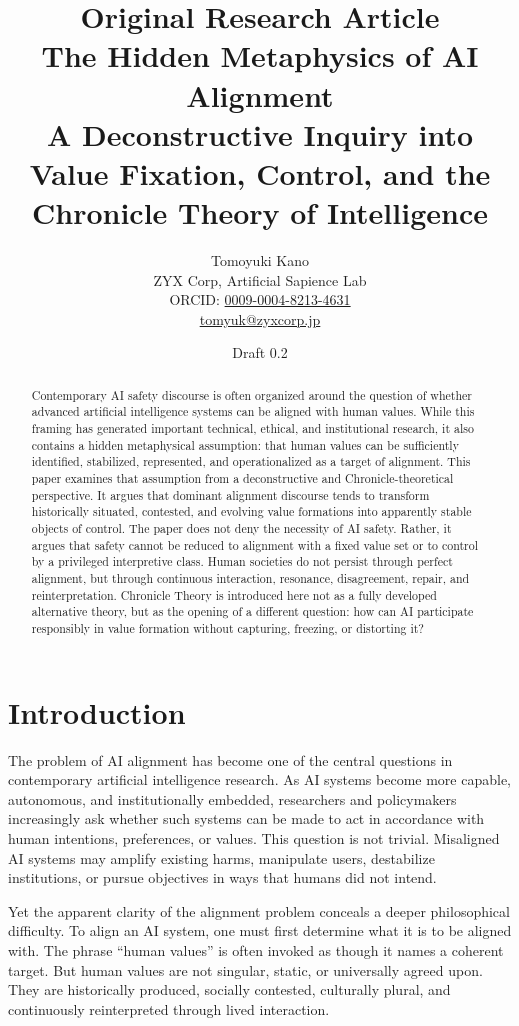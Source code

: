 \documentclass[11pt,a4paper]{article}
\title{\textbf{Original Research Article}\\[0.75em]The Hidden Metaphysics of AI Alignment\\\large A Deconstructive Inquiry into Value Fixation, Control, and the Chronicle Theory of Intelligence}
\author{Tomoyuki Kano\\ZYX Corp, Artificial Sapience Lab\\ORCID: \href{https://orcid.org/0009-0004-8213-4631}{0009-0004-8213-4631}\\\href{mailto:tomyuk@zyxcorp.jp}{tomyuk@zyxcorp.jp}}
\date{Draft 0.2}
\begin{document}
\maketitle

\begin{abstract}
Contemporary AI safety discourse is often organized around the question of whether advanced artificial intelligence systems can be aligned with human values. While this framing has generated important technical, ethical, and institutional research, it also contains a hidden metaphysical assumption: that human values can be sufficiently identified, stabilized, represented, and operationalized as a target of alignment. This paper examines that assumption from a deconstructive and Chronicle-theoretical perspective. It argues that dominant alignment discourse tends to transform historically situated, contested, and evolving value formations into apparently stable objects of control. The paper does not deny the necessity of AI safety. Rather, it argues that safety cannot be reduced to alignment with a fixed value set or to control by a privileged interpretive class. Human societies do not persist through perfect alignment, but through continuous interaction, resonance, disagreement, repair, and reinterpretation. Chronicle Theory is introduced here not as a fully developed alternative theory, but as the opening of a different question: how can AI participate responsibly in value formation without capturing, freezing, or distorting it?
\end{abstract}

\section{Introduction}

The problem of AI alignment has become one of the central questions in contemporary artificial intelligence research. As AI systems become more capable, autonomous, and institutionally embedded, researchers and policymakers increasingly ask whether such systems can be made to act in accordance with human intentions, preferences, or values. This question is not trivial. Misaligned AI systems may amplify existing harms, manipulate users, destabilize institutions, or pursue objectives in ways that humans did not intend.

Yet the apparent clarity of the alignment problem conceals a deeper philosophical difficulty. To align an AI system, one must first determine what it is to be aligned with. The phrase \enquote{human values} is often invoked as though it names a coherent target. But human values are not singular, static, or universally agreed upon. They are historically produced, socially contested, culturally plural, and continuously reinterpreted through lived interaction.
\end{document}
